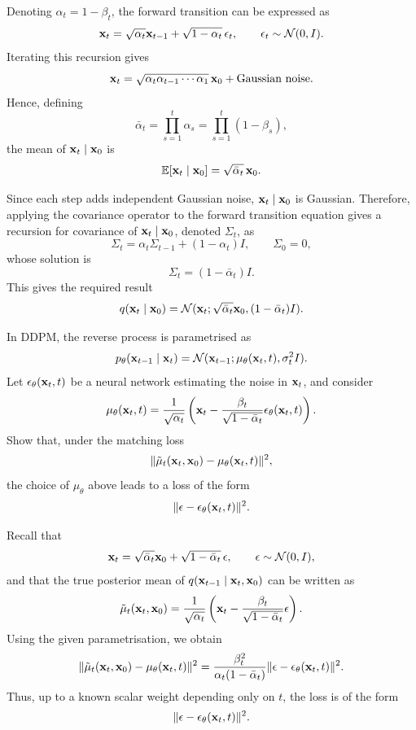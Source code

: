 \begin{solution}
Denoting $\alpha_t=1-\beta_t$, the forward transition can be expressed as 
\[
{ \mathbf{x}}_t=\sqrt{\alpha_t}{ \mathbf{x}}_{t-1}+\sqrt{1-\alpha_t}\,\epsilon_t,
\qquad \epsilon_t\sim{\mathcal N}(0,I).
\]
Iterating this recursion gives
\[
{ \mathbf{x}}_t
=
\sqrt{\alpha_t\alpha_{t-1}\cdots \alpha_1}\,{ \mathbf{x}}_0
+
\text{Gaussian noise}.
\]
Hence, defining
\[
\bar\alpha_t=\prod_{s=1}^t \alpha_s=\prod_{s=1}^t(1-\beta_s),
\]
the mean of ${ \mathbf{x}}_t\mid { \mathbf{x}}_0$ is
\[
\mathbb{E}[{ \mathbf{x}}_t\mid { \mathbf{x}}_0]=\sqrt{\bar\alpha_t}\,{ \mathbf{x}}_0.
\]

Since each step adds independent Gaussian noise, ${ \mathbf{x}}_t\mid { \mathbf{x}}_0$ is Gaussian. Therefore, applying the covariance operator to the forward transition equation gives a recursion for covariance of ${ \mathbf{x}}_t\mid { \mathbf{x}}_0$, denoted $\Sigma_t$, as
\[
\Sigma_t=\alpha_t \Sigma_{t-1}+(1-\alpha_t)I,
\qquad \Sigma_0=0,
\]
whose solution is
\[
\Sigma_t=(1-\bar\alpha_t)I.
\]
This gives the required result
\[
q({ \mathbf{x}}_t\mid{ \mathbf{x}}_0)={\mathcal N}({ \mathbf{x}}_t;\sqrt{\bar\alpha_t}{ \mathbf{x}}_0,(1-\bar\alpha_t)I).
\]

\end{solution}

\begin{exercise}
In DDPM, the reverse process is parametrised as
\[
p_\theta({ \mathbf{x}}_{t-1}\mid { \mathbf{x}}_t)={\mathcal N}({ \mathbf{x}}_{t-1};\mu_\theta({ \mathbf{x}}_t,t),\sigma_t^2 I).
\]
Let $\epsilon_\theta({ \mathbf{x}}_t,t)$ be a neural network estimating the noise in ${ \mathbf{x}}_t$, and consider
\[
\mu_\theta({ \mathbf{x}}_t,t) = \frac{1}{\sqrt{\alpha_t}}\left({ \mathbf{x}}_t - \frac{\beta_t}{\sqrt{1-\bar\alpha_t}}\epsilon_\theta({ \mathbf{x}}_t,t)\right).
\]
Show that, under the matching loss
\[
\|\tilde\mu_t({ \mathbf{x}}_t,{ \mathbf{x}}_0)-\mu_\theta({ \mathbf{x}}_t,t)\|^2,
\]
the choice of  $\mu_\theta$ above leads to a loss of the form
\[
\|\epsilon - \epsilon_\theta({ \mathbf{x}}_t,t)\|^2.
\]
\end{exercise}

\begin{solution}
Recall that
\[
{ \mathbf{x}}_t=\sqrt{\bar\alpha_t}{ \mathbf{x}}_0+\sqrt{1-\bar\alpha_t}\,\epsilon,
\qquad \epsilon\sim{\mathcal N}(0,I),
\]
and that the true posterior mean of $q({ \mathbf{x}}_{t-1}\mid { \mathbf{x}}_t,{ \mathbf{x}}_0)$ can be written as
\[
\tilde\mu_t({ \mathbf{x}}_t,{ \mathbf{x}}_0)
=
\frac{1}{\sqrt{\alpha_t}}
\left(
{ \mathbf{x}}_t-\frac{\beta_t}{\sqrt{1-\bar\alpha_t}}\epsilon
\right).
\]
Using the given parametrisation, we obtain
\[
\|\tilde\mu_t({ \mathbf{x}}_t,{ \mathbf{x}}_0)-\mu_\theta({ \mathbf{x}}_t,t)\|^2
=
\frac{\beta_t^2}{\alpha_t(1-\bar\alpha_t)}
\|\epsilon-\epsilon_\theta({ \mathbf{x}}_t,t)\|^2.
\]
Thus, up to a known scalar weight depending only on $t$, the loss is of the form
\[
\|\epsilon-\epsilon_\theta({ \mathbf{x}}_t,t)\|^2.
\]
\end{solution}


